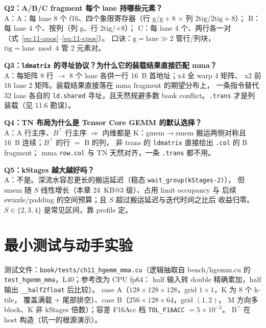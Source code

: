 \textbf{Q2：A/B/C fragment 每个 lane 持哪些元素？}\\
A：A：每 lane 8 个 f16、四个象限寄存器（行 $\mathrm{g}$/$\mathrm{g}{+}8$
$\times$ 列 $2\mathrm{tig}$/$2\mathrm{tig}{+}8$）；
B：每 lane 4 个、按列（列 $\mathrm{g}$、行 $2\mathrm{tig}$/$+8$）；
C：每 lane 4 个、两行各一对（式~\ref{eq:11-apos}--\ref{eq:11-cpos}）。
口诀：$\mathrm{g} = \mathrm{lane} \gg 2$ 管行/列块，$\mathrm{tig} = \mathrm{lane} \bmod 4$ 管 2 元素对。

\textbf{Q3：\texttt{ldmatrix} 的寻址协议？为什么它的装载结果直接匹配 mma？}\\
A：每矩阵 8 行 $\to$ 8 个 lane 各供一行 16~B 首地址；x4 全 warp 4 矩阵、
x2 前 16 lane 2 矩阵。装载结果直接落在 mma fragment 的期望分布上，
一条指令替代 32 lane 各自的 \texttt{ld.shared} 寻址，且天然规避多数
bank conflict。\texttt{.trans} 才是列装载（见 11.6 勘误）。

\textbf{Q4：TN 布局为什么是 Tensor Core GEMM 的默认选择？}\\
A：A 行主序、$B^{\top}$ 行主序 $\Rightarrow$ 内维都是 K：gmem$\to$smem
搬运两侧对称且 16~B 连续；$B^{\top}$ 的行 $=$ B 的列，
非 trans 的 \texttt{ldmatrix} 直接给出 \texttt{.col} 的 B fragment；
mma \texttt{row.col} 与 TN 天然对齐，一条 \texttt{.trans} 都不用。

\textbf{Q5：kStages 越大越好吗？}\\
A：不是。深流水容忍更长的搬运延迟（稳态 \texttt{wait\_\allowbreak{}group\allowbreak{}(k\allowbreak{}Stages-2)}），
但 smem 随 $S$ 线性增长（本章 24~KB$@$3 级）、占用 limit occupancy 与
后续 swizzle/padding 的空间预算；且 $S$ 超过搬运延迟与迭代时间之比后
收益归零。$S\in\{2,3,4\}$ 是常见区间，靠 profile 定。

\section{最小测试与动手实验}

测试文件：\texttt{book/\allowbreak{}tests/\allowbreak{}ch11\_\allowbreak{}hgemm\_\allowbreak{}mma.cu}（逻辑抽取自
bench/hgemm.cu 的 \texttt{test\_\allowbreak{}hgemm\_\allowbreak{}mma}，L40；参考改为 CPU fp64：
half 输入转 double 精确累加，half 输出 \texttt{\_\allowbreak{}\_\allowbreak{}half2float} 后比较）。
case A（$128\times128\times128$，grid $1\times1$，K 为 8 个 k-tile，
覆盖满载 + 尾部排空）、case B（$256\times128\times64$，grid $(1,2)$，
M 方向多 block、K 非 kStages 倍数）；容差 F16Acc 档
\texttt{TOL\_F16ACC} $= 5\times10^{-2}$。
B$^{\top}$ 在 host 构造（坑一的根源演示）。


